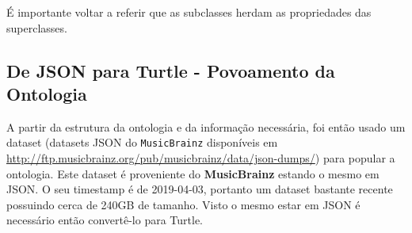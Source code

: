 \documentclass{article}
\begin{document}
É importante voltar a referir que as subclasses herdam as propriedades das superclasses.

\subsection{De JSON para Turtle - Povoamento da Ontologia} \label{ontoPop}

A partir da estrutura da ontologia e da informação necessária, foi então usado um dataset (datasets JSON do \texttt{MusicBrainz} disponíveis em \url{http://ftp.musicbrainz.org/pub/musicbrainz/data/json-dumps/}) para popular a ontologia. Este dataset é proveniente do \textbf{MusicBrainz} estando o mesmo em JSON. O seu timestamp é de 2019-04-03, portanto um dataset bastante recente possuindo cerca de 240GB de tamanho. Visto o mesmo estar em JSON é necessário então convertê-lo para Turtle.
\end{document}
